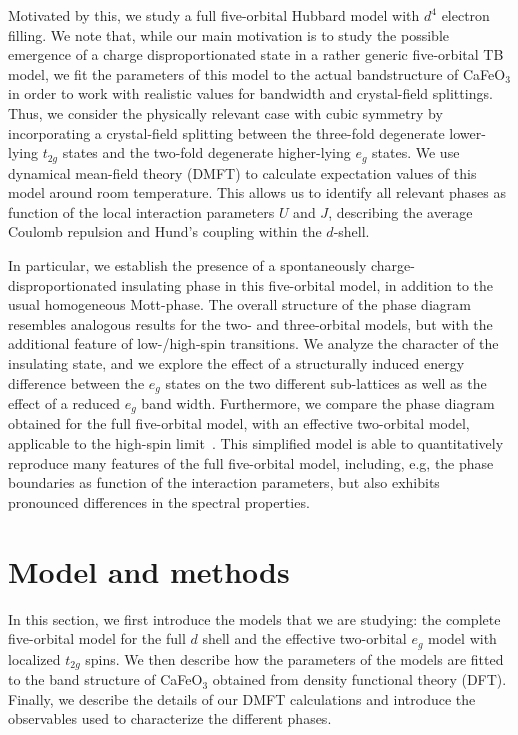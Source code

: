 \documentclass[aps,prb,twocolumn,superscriptaddress,10pt]{revtex4-1}
\begin{document}
Motivated by this, we study a full five-orbital Hubbard model with $d^4$ electron filling. We note that, while our main motivation is to study the possible emergence of a charge disproportionated state in a rather generic five-orbital TB model, we fit the parameters of this model to the actual bandstructure of CaFeO$_3$ in order to work with realistic values for bandwidth and crystal-field splittings. Thus, we consider the physically relevant case with cubic symmetry by incorporating a crystal-field splitting between the three-fold degenerate lower-lying $t_{2g}$ states and the two-fold degenerate higher-lying $e_g$ states.
%
We use dynamical mean-field theory (DMFT) to calculate expectation values of this model around room temperature. This allows us to identify all relevant phases as function of the local interaction parameters $U$ and $J$, describing the average Coulomb repulsion and Hund's coupling within the $d$-shell. 

In particular, we establish the presence of a spontaneously charge-disproportionated insulating phase in this five-orbital model, in addition to the usual homogeneous Mott-phase. The overall structure of the phase diagram resembles analogous results for the two- and three-orbital models, but with the additional feature of low-/high-spin transitions.
We analyze the character of the insulating state, and we explore the effect of a structurally induced energy difference between the $e_g$ states on the two different sub-lattices as well as the effect of a reduced $e_g$ band width.
%
Furthermore, we compare the phase diagram obtained for the full five-orbital model, with an effective two-orbital model, applicable to the high-spin limit~\cite{ahn_effects_2000, pavarini_origin_2010}. This simplified model is able to quantitatively reproduce many features of the full five-orbital model, including, e.g,  the phase boundaries as function of the interaction parameters, but also exhibits pronounced differences in the spectral properties. 

\section{Model and methods}

In this section, we first introduce the models that we are studying: the complete five-orbital model for the full $d$ shell and the effective two-orbital $e_g$ model with localized $t_{2g}$ spins. 
We then describe how the parameters of the models are fitted to the band structure of CaFeO$_3$ obtained from density functional theory (DFT). Finally, we describe the details of our DMFT calculations and introduce the observables used to characterize the different phases.
\end{document}
